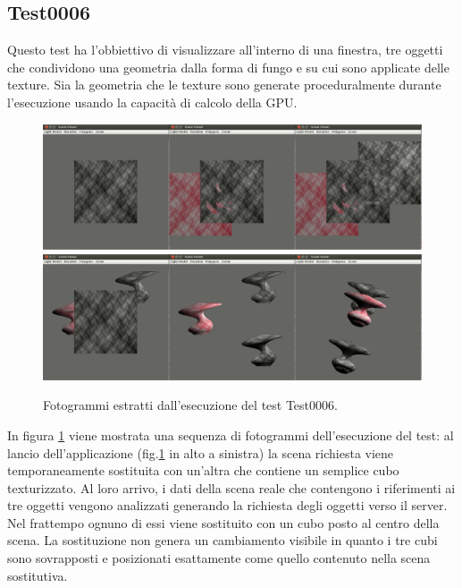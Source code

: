 \subsection{Test0006}
Questo test ha l'obbiettivo di visualizzare all'interno di una finestra, tre oggetti che condividono una geometria dalla forma di fungo e su cui sono applicate delle texture. Sia la geometria che le texture sono generate proceduralmente durante l'esecuzione usando la capacit\`a di calcolo della \ac{GPU}.
\begin{figure}%
\begin{center}
\includegraphics[width=\textwidth]{Immagini/test0006/test0006-wall1}
\includegraphics[width=\textwidth]{Immagini/test0006/test0006-wall2}
\caption{Fotogrammi estratti dall'esecuzione del test Test0006. \label{f:test0006-wall}} 
\end{center} 
\end{figure}
In figura \ref{f:test0006-wall} viene mostrata una sequenza di fotogrammi dell'esecuzione del test: al lancio dell'applicazione (fig.\ref{f:test0006-wall} in alto a sinistra) la scena richiesta viene temporaneamente sostituita con un'altra che contiene un semplice cubo texturizzato. 
Al loro arrivo, i dati della scena reale che contengono i riferimenti ai tre oggetti vengono analizzati generando la richiesta degli oggetti verso il server. Nel frattempo ognuno di essi viene sostituito con un cubo posto al centro della scena. La sostituzione non genera un cambiamento visibile in quanto i tre cubi sono sovrapposti e posizionati esattamente come quello contenuto nella scena sostitutiva.

